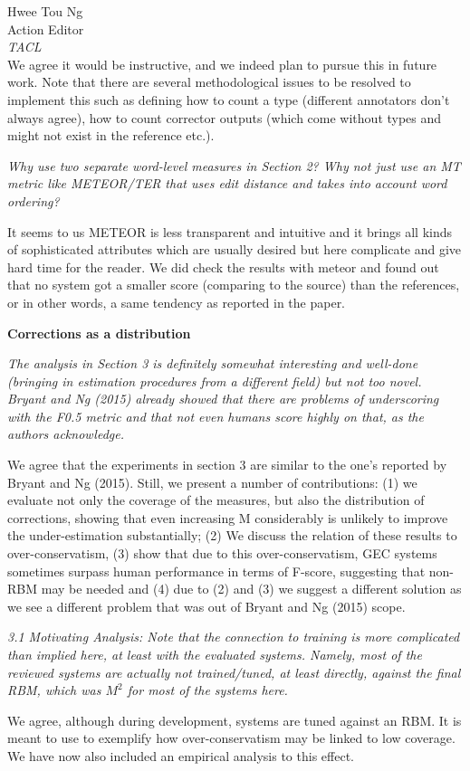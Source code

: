 \documentclass[11pt,letterpaper]{letter}
\begin{document}
\begin{letter}{%
Hwee Tou Ng\\
Action Editor\\
{\em TACL}\\
}
	We agree it would be instructive, and we indeed plan to pursue this in future work. Note that there are several methodological issues to be resolved to implement this such as defining how to count a type (different annotators don't always agree), how to count corrector outputs (which come without types and might not exist in the reference etc.).
	
\emph{Why use two separate word-level measures in Section 2? Why not just use
	an MT metric like METEOR/TER that uses edit distance and takes into account
	word ordering?}

It seems to us METEOR is less transparent and intuitive and it brings all kinds of sophisticated attributes which are usually desired but here complicate and give hard time for the reader. We did check the results with meteor and found out that no system got a smaller score (comparing to the source) than the references, or in other words, a same tendency as reported in the paper.

{\bf Corrections as a distribution}

\emph{The analysis in Section 3 is definitely somewhat interesting and
	well-done (bringing in estimation procedures from a different field) but not
	too novel. Bryant and Ng (2015) already showed that there are problems of
	underscoring with the F0.5 metric and that not even humans score highly on
	that, as the authors acknowledge.
	}
	
We agree that the experiments in section 3 are similar to the one's reported by Bryant and Ng (2015). Still, we present a number of contributions: (1) we evaluate not only the coverage of the measures, but also the distribution of corrections, showing that even increasing M considerably is unlikely to improve the under-estimation substantially; (2) We discuss the relation of these results to over-conservatism, (3) show that due to this over-conservatism, GEC systems sometimes surpass human performance in terms of F-score, suggesting that non-RBM may be needed and (4) due to (2) and (3) we suggest a different solution as we see a different problem that was out of Bryant and Ng (2015) scope.

\emph{3.1 Motivating Analysis: Note that the connection to training is more
	complicated than implied here, at least with the evaluated systems. Namely,
	most of the reviewed systems are actually not trained/tuned, at least
	directly, against the final RBM, which was $M^2$ for most of the systems here.
	}
	
	We agree, although during development, systems are tuned against an RBM. It is meant to use to exemplify how over-conservatism may be linked to low coverage. We have now also included an empirical analysis to this effect.
	

\end{letter}
\end{document}
